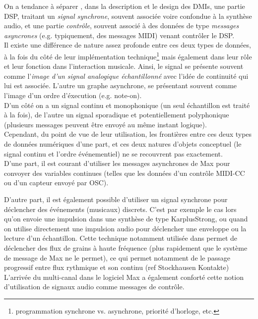 \noindent On a tendance à séparer , dans la description et le design des \glspl{DMI}, une partie \gls{DSP}, traitant un \textit{signal synchrone}, souvent associée voire confondue à la synthèse audio, et une partie \textit{contrôle}, souvent associé à des données de type \textit{messages asyncrones} (e.g. typiquement, des messages \gls{MIDI}) venant contrôler le \gls{DSP}.\\
\indent Il existe une différence de nature assez profonde entre ces deux types de données, à la fois du côté de leur implémentation technique\footnote{programmation synchrone vs. asynchrone, priorité d'horloge, etc.} mais également dans leur rôle et leur fonction dans l'interaction musicale. 
Ainsi, le signal se présente souvent comme l'\textit{image d'un signal analogique échantillonné} avec l'idée de continuité qui lui est associée. L'autre un graphe asynchrone, se présentant souvent comme l'image d'un ordre d'éxecution (e.g. note-on). \\
\indent D'un côté on a un signal continu et monophonique (un seul échantillon est traité à la fois), de l'autre un signal sporadique et potentiellement polyphonique (plusieurs messages peuvent être envoyé au même instant logique).\\
\indent Cependant, du point de vue de leur utilisation, les frontières entre ces deux types de données numériques d'une part, et ces deux natures d'objets conceptuel (le signal continu et l'ordre événementiel) ne se recouvrent pas exactement. \\
\indent D'une part, il est courant d'utiliser les messages asynchrones de Max pour convoyer des variables continues (telles que les données d'un contrôle MIDI-CC ou d'un capteur envoyé par \gls{OSC}).\\


\indent D'autre part, il est également possible d'utiliser un signal synchrone pour déclencher des événements (musicaux) discrets. C'est par exemple le cas lors qu'on envoie une impulsion dans une synthèse de type \gls{KarplusStrong}, ou quand on utilise directement une impulsion audio pour déclencher une enveloppe ou la lecture d'un échantillon.
Cette technique notamment utilisée dans \cite{bascou_gmu_2005} permet de déclencher des flux de grains à haute fréquence (plus rapidement que le système de message de Max ne le permet), ce qui permet notamment de le passage progressif entre flux rythmique et son continu (ref Stockhausen Kontakte)\\
\indent L'arrivée du multi-canal dans le logiciel Max a également conforté cette notion d'utilisation de signaux audio comme messages de contrôle.


